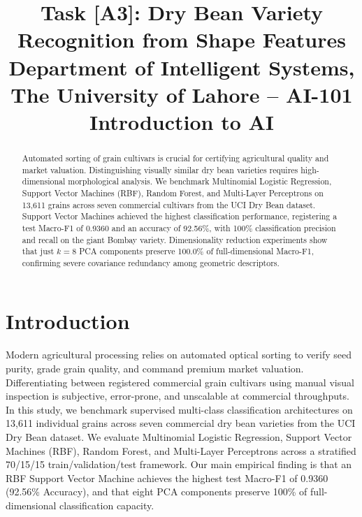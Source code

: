 \documentclass[conference,10pt]{IEEEtran}
\begin{document}
\title{Task [A3]: Dry Bean Variety Recognition from Shape Features\\
\large Department of Intelligent Systems, The University of Lahore -- AI-101 Introduction to AI}

\author{
}

\maketitle

\begin{abstract}
Automated sorting of grain cultivars is crucial for certifying agricultural quality and market valuation. Distinguishing visually similar dry bean varieties requires high-dimensional morphological analysis. We benchmark Multinomial Logistic Regression, Support Vector Machines (RBF), Random Forest, and Multi-Layer Perceptrons on 13,611 grains across seven commercial cultivars from the UCI Dry Bean dataset. Support Vector Machines achieved the highest classification performance, registering a test Macro-F1 of 0.9360 and an accuracy of 92.56\%, with 100\% classification precision and recall on the giant Bombay variety. Dimensionality reduction experiments show that just $k=8$ PCA components preserve 100.0\% of full-dimensional Macro-F1, confirming severe covariance redundancy among geometric descriptors.
\end{abstract}

\section{Introduction}
Modern agricultural processing relies on automated optical sorting to verify seed purity, grade grain quality, and command premium market valuation. Differentiating between registered commercial grain cultivars using manual visual inspection is subjective, error-prone, and unscalable at commercial throughputs. In this study, we benchmark supervised multi-class classification architectures on 13,611 individual grains across seven commercial dry bean varieties from the UCI Dry Bean dataset. We evaluate Multinomial Logistic Regression, Support Vector Machines (RBF), Random Forest, and Multi-Layer Perceptrons across a stratified 70/15/15 train/validation/test framework. Our main empirical finding is that an RBF Support Vector Machine achieves the highest test Macro-F1 of 0.9360 (92.56\% Accuracy), and that eight PCA components preserve 100\% of full-dimensional classification capacity.
\end{document}
